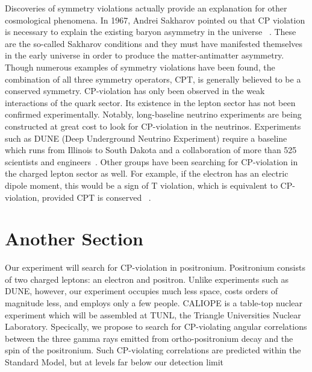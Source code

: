 Discoveries of symmetry violations actually provide an explanation for other cosmological phenomena. In 1967, Andrei Sakharov pointed ou that CP violation is necessary to explain the existing baryon asymmetry in the universe ~\cite{0038-5670-34-5-A08}. These are the so-called Sakharov conditions and they must have manifested themselves in the early universe in order to produce the matter-antimatter asymmetry. Though numerous examples of symmetry violations have been found, the combination of all three symmetry operators, CPT, is generally believed to be a conserved symmetry. CP-violation has only been observed in the weak interactions of the quark sector. Its existence in the lepton sector has not been confirmed experimentally. Notably, long-baseline neutrino experiments are being constructed at great cost to look for CP-violation in the neutrinos. Experiments such as DUNE (Deep Underground Neutrino Experiment) require a baseline which runs from Illinois to South Dakota and a collaboration of more than 525 scientists and engineers~\cite{LBNE}. Other groups have been searching for CP-violation in the charged lepton sector as well. For example, if the electron has an electric dipole moment, this would be a sign of T violation, which is equivalent to CP-violation, provided CPT is conserved ~\cite{PhysRevLett.100.120801}.


\section{Another Section}
\label{sec:mjd}


Our experiment will search for CP-violation in positronium. Positronium consists of two charged leptons: an
electron and positron. Unlike experiments such as DUNE, however, our experiment occupies much less space,
costs orders of magnitude less, and employs only a few people. CALIOPE is a table-top nuclear experiment
which will be assembled at TUNL, the Triangle Universities Nuclear Laboratory. Specically, we propose to
search for CP-violating angular correlations between the three gamma rays emitted from ortho-positronium
decay and the spin of the positronium. Such CP-violating correlations are predicted within the Standard
Model, but at levels far below our detection limit

